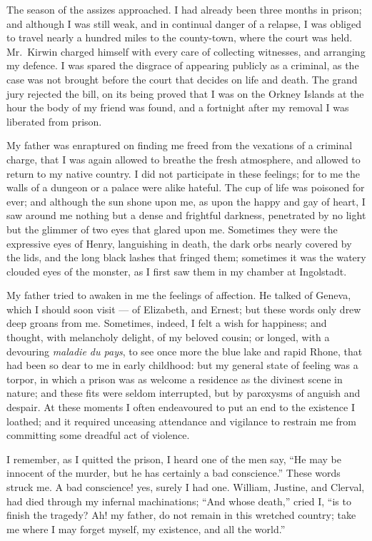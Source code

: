 The season of the assizes approached.
I had already been three months in
prison; and although I was still weak,
and in continual danger of a relapse, I
was obliged to travel nearly a hundred
miles to the county-town, where the
court was held. Mr.~Kirwin charged
himself with every care of collecting
witnesses, and arranging my defence.
I was spared the disgrace of appearing
publicly as a criminal, as the case was
not brought before the court that decides
on life and death. The grand
jury rejected the bill, on its being
proved that I was on the Orkney Islands
at the hour the body of my friend was
found, and a fortnight after my removal
I was liberated from prison.

My father was enraptured on finding
me freed from the vexations of a criminal
charge, that I was again allowed
to breathe the fresh atmosphere, and
allowed to return to my native country.
I did not participate in these feelings;
for to me the walls of a dungeon or a
palace were alike hateful. The cup of
life was poisoned for ever; and although
the sun shone upon me, as upon
the happy and gay of heart, I saw
around me nothing but a dense and
frightful darkness, penetrated by no
light but the glimmer of two eyes that
glared upon me. Sometimes they were
the expressive eyes of Henry, languishing
in death, the dark orbs nearly
covered by the lids, and the long black
lashes that fringed them; sometimes it
was the watery clouded eyes of the monster,
as I first saw them in my chamber
at Ingolstadt.

My father tried to awaken in me the
feelings of affection. He talked of
Geneva, which I should soon visit --- of
Elizabeth, and Ernest; but these words
only drew deep groans from me. Sometimes,
indeed, I felt a wish for happiness;
and thought, with melancholy delight,
of my beloved cousin; or longed,
with a devouring \emph{maladie du pays}, to
see once more the blue lake and rapid
Rhone, that had been so dear to me in
early childhood: but my general state
of feeling was a torpor, in which a
prison was as welcome a residence as
the divinest scene in nature; and these
fits were seldom interrupted, but by
paroxysms of anguish and despair. At
these moments I often endeavoured to
put an end to the existence I loathed;
and it required unceasing attendance
and vigilance to restrain me from
committing some dreadful act of violence.

I remember, as I quitted the prison,
I heard one of the men say, ``He may
be innocent of the murder, but he has
certainly a bad conscience.'' These
words struck me. A bad conscience!
yes, surely I had one. William, Justine,
and Clerval, had died through
my infernal machinations; ``And whose
death,'' cried I, ``is to finish the tragedy?
Ah! my father, do not remain
in this wretched country; take me
where I may forget myself, my existence,
and all the world.''

